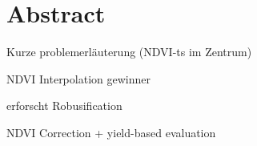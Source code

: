 \chapter*{Abstract}
Kurze problemerläuterung (NDVI-ts im Zentrum)

NDVI Interpolation gewinner

erforscht Robusification 

NDVI Correction + yield-based evaluation

